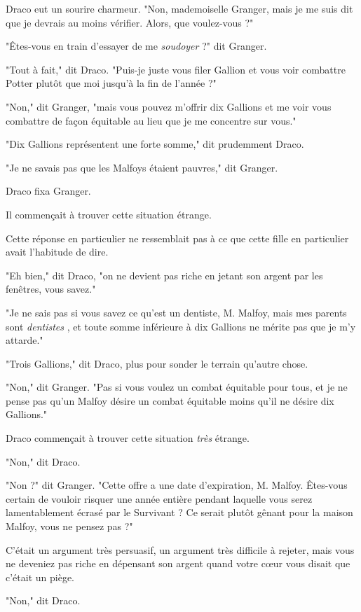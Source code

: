Draco eut un sourire charmeur. "Non, mademoiselle Granger, mais je me suis dit que je devrais au moins vérifier. Alors, que voulez-vous ?"

"Êtes-vous en train d'essayer de me \emph{soudoyer}  ?" dit Granger.

"Tout à fait," dit Draco. "Puis-je juste vous filer Gallion et vous voir combattre Potter plutôt que moi jusqu'à la fin de l'année ?"

"Non," dit Granger, "mais vous pouvez m'offrir dix Gallions et me voir vous combattre de façon équitable au lieu que je me concentre sur vous."

"Dix Gallions représentent une forte somme," dit prudemment Draco.

"Je ne savais pas que les Malfoys étaient pauvres," dit Granger.

Draco fixa Granger.

Il commençait à trouver cette situation étrange.

Cette réponse en particulier ne ressemblait pas à ce que cette fille en particulier avait l'habitude de dire.

"Eh bien," dit Draco, "on ne devient pas riche en jetant son argent par les fenêtres, vous savez."

"Je ne sais pas si vous savez ce qu'est un dentiste, M. Malfoy, mais mes parents sont \emph{dentistes} , et toute somme inférieure à dix Gallions ne mérite pas que je m'y attarde."

"Trois Gallions," dit Draco, plus pour sonder le terrain qu'autre chose.

"Non," dit Granger. "Pas si vous voulez un combat équitable pour tous, et je ne pense pas qu'un Malfoy désire un combat équitable moins qu'il ne désire dix Gallions."

Draco commençait à trouver cette situation \emph{très}  étrange.

"Non," dit Draco.

"Non ?" dit Granger. "Cette offre a une date d'expiration, M. Malfoy. Êtes-vous certain de vouloir risquer une année entière pendant laquelle vous serez lamentablement écrasé par le Survivant ? Ce serait plutôt gênant pour la maison Malfoy, vous ne pensez pas ?"

C'était un argument très persuasif, un argument très difficile à rejeter, mais vous ne deveniez pas riche en dépensant son argent quand votre cœur vous disait que c'était un piège.

"Non," dit Draco.

